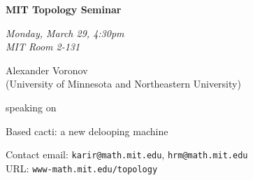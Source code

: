 \documentclass{slides}
\begin{document}
\begin{center}

{\fontsize {54pt}{40pt}\selectfont

\textrm{
{\textbf{MIT Topology Seminar}}}
}
\medskip


{\large\textrm{\emph{Monday, March 29, 4:30pm\\MIT Room 2-131}}}



\bigskip

\textrm{{\LARGE Alexander Voronov  \\[.5cm](University of Minnesota and 
Northeastern University)}}

\bigskip\bigskip\bigskip
\textrm{speaking on}
\bigskip\bigskip\bigskip

\textrm{\LARGE Based cacti: a new delooping machine}\\

\end{center}

\vspace{1cm}

{\small
\textrm{Contact email: } \texttt{karir@math.mit.edu}, \texttt{hrm@math.mit.edu}\\
\textrm{URL: } \texttt{www-math.mit.edu/topology}
}
\end{document}
